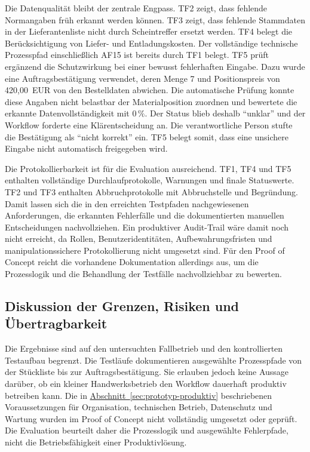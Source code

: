 \documentclass[a4paper,12pt]{article}
\begin{document}
Die Datenqualität bleibt der zentrale Engpass. TF2 zeigt, dass fehlende Normangaben früh erkannt werden können. TF3 zeigt, dass fehlende Stammdaten in der Lieferantenliste nicht durch Scheintreffer ersetzt werden. TF4 belegt die Berücksichtigung von Liefer- und Entladungskosten. Der vollständige technische Prozesspfad einschließlich AF15 ist bereits durch TF1 belegt. TF5 prüft ergänzend die Schutzwirkung bei einer bewusst fehlerhaften Eingabe. Dazu wurde eine Auftragsbestätigung verwendet, deren Menge 7 und Positionspreis von 420,00~EUR von den Bestelldaten abwichen. Die automatische Prüfung konnte diese Angaben nicht belastbar der Materialposition zuordnen und bewertete die erkannte Datenvollständigkeit mit \(0\,\%\). Der Status blieb deshalb \enquote{unklar} und der Workflow forderte eine Klärentscheidung an. Die verantwortliche Person stufte die Bestätigung als \enquote{nicht korrekt} ein. TF5 belegt somit, dass eine unsichere Eingabe nicht automatisch freigegeben wird.

Die Protokollierbarkeit ist für die Evaluation ausreichend. TF1, TF4 und TF5 enthalten vollständige Durchlaufprotokolle, Warnungen und finale Statuswerte. TF2 und TF3 enthalten Abbruchprotokolle mit Abbruchstelle und Begründung. Damit lassen sich die in den erreichten Testpfaden nachgewiesenen Anforderungen, die erkannten Fehlerfälle und die dokumentierten manuellen Entscheidungen nachvollziehen. Ein produktiver Audit-Trail wäre damit noch nicht erreicht, da Rollen, Benutzeridentitäten, Aufbewahrungsfristen und manipulationssichere Protokollierung nicht umgesetzt sind. Für den Proof of Concept reicht die vorhandene Dokumentation allerdings aus, um die Prozesslogik und die Behandlung der Testfälle nachvollziehbar zu bewerten.

\subsection{Diskussion der Grenzen, Risiken und Übertragbarkeit}
Die Ergebnisse sind auf den untersuchten Fallbetrieb und den kontrollierten Testaufbau begrenzt. Die Testläufe dokumentieren ausgewählte Prozesspfade von der Stückliste bis zur Auftragsbestätigung. Sie erlauben jedoch keine Aussage darüber, ob ein kleiner Handwerksbetrieb den Workflow dauerhaft produktiv betreiben kann. Die in \hyperref[sec:prototyp-produktiv]{Abschnitt~\ref*{sec:prototyp-produktiv}} beschriebenen Voraussetzungen für Organisation, technischen Betrieb, Datenschutz und Wartung wurden im Proof of Concept nicht vollständig umgesetzt oder geprüft. Die Evaluation beurteilt daher die Prozesslogik und ausgewählte Fehlerpfade, nicht die Betriebsfähigkeit einer Produktivlösung.
\end{document}
